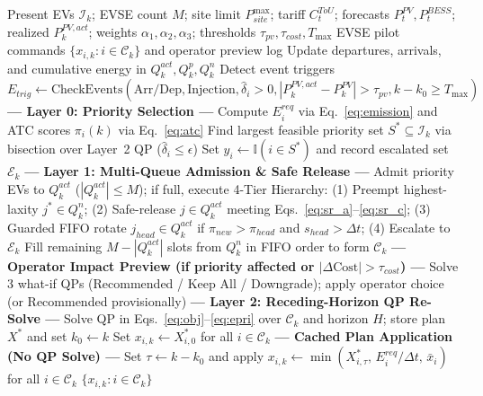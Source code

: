 \documentclass[final,3p,times,twocolumn]{elsarticle}
\begin{document}
\begin{algorithm}[htbp]
\caption{Three-Layer Closed-Loop Event-Triggered AQPS (\texttt{AQPS-RT-ET})}
\label{alg:aqps_et}
\footnotesize
\begin{algorithmic}[1]
\Require Present EVs $\mathcal{I}_k$; EVSE count $M$; site limit $P_{site}^{\max}$; tariff $C_t^{ToU}$; forecasts $P_t^{PV}, P_t^{BESS}$; realized $P_k^{PV,act}$; weights $\alpha_1, \alpha_2, \alpha_3$; thresholds $\tau_{pv}, \tau_{cost}, T_{\max}$
\Ensure EVSE pilot commands $\{x_{i,k} : i \in \mathcal{C}_k\}$ and operator preview log
\State Update departures, arrivals, and cumulative energy in $Q_k^{act}, Q_k^p, Q_k^n$
\State Detect event triggers $E_{trig} \leftarrow \text{CheckEvents}(\text{Arr/Dep}, \text{Injection}, \hat{\delta}_i > 0, |P_k^{PV,act}-P_k^{PV}| > \tau_{pv}, k - k_0 \ge T_{\max})$
    \State \textbf{--- Layer 0: Priority Selection ---}
        \State Compute $E_i^{req}$ via Eq.~\eqref{eq:emission} and ATC scores $\pi_i(k)$ via Eq.~\eqref{eq:atc}
        \State Find largest feasible priority set $S^* \subseteq \mathcal{I}_k$ via bisection over Layer~2 QP ($\hat{\delta}_i \le \epsilon$)
        \State Set $y_i \leftarrow \mathbb{I}(i \in S^*)$ and record escalated set $\mathcal{E}_k$
    \EndIf
    \State \textbf{--- Layer 1: Multi-Queue Admission & Safe Release ---}
    \State Admit priority EVs to $Q_k^{act}$ ($|Q_k^{act}| \le M$); if full, execute 4-Tier Hierarchy:
    \State \quad (1) Preempt highest-laxity $j^* \in Q_k^n$; (2) Safe-release $j \in Q_k^{act}$ meeting Eqs.~\eqref{eq:sr_a}--\eqref{eq:sr_c};
    \State \quad (3) Guarded FIFO rotate $j_{head} \in Q_k^{act}$ if $\pi_{new} > \pi_{head}$ and $s_{head} > \Delta t$; (4) Escalate to $\mathcal{E}_k$
    \State Fill remaining $M - |Q_k^{act}|$ slots from $Q_k^n$ in FIFO order to form $\mathcal{C}_k$
    \State \textbf{--- Operator Impact Preview (if priority affected or $|\Delta\text{Cost}| > \tau_{cost}$) ---}
    \State Solve 3 what-if QPs (Recommended / Keep All / Downgrade); apply operator choice (or Recommended provisionally)
    \State \textbf{--- Layer 2: Receding-Horizon QP Re-Solve ---}
    \State Solve QP in Eqs.~\eqref{eq:obj}--\eqref{eq:epri} over $\mathcal{C}_k$ and horizon $H$; store plan $X^*$ and set $k_0 \leftarrow k$
    \State Set $x_{i,k} \leftarrow X^*_{i,0}$ for all $i \in \mathcal{C}_k$
\Else
    \State \textbf{--- Cached Plan Application (No QP Solve) ---}
    \State Set $\tau \leftarrow k - k_0$ and apply $x_{i,k} \leftarrow \min(X^*_{i,\tau}, \, E_i^{req}/\Delta t, \, \bar{x}_i)$ for all $i \in \mathcal{C}_k$
\EndIf
\State \Return $\{x_{i,k} : i \in \mathcal{C}_k\}$
\end{algorithmic}
\end{algorithm}
\end{document}

